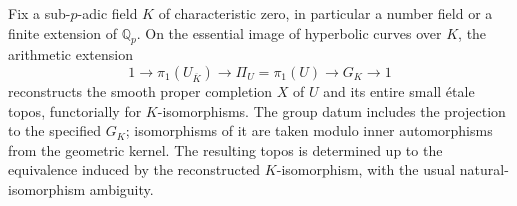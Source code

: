 Fix a sub-$p$-adic field $K$ of characteristic zero, in
particular a number field or a finite extension of
$\mathbb Q_p$.  On the essential image of hyperbolic curves
over $K$, the arithmetic extension
\[
 1\longrightarrow\pi_1(U_{\overline K})
 \longrightarrow\Pi_U=\pi_1(U)
 \longrightarrow G_K\longrightarrow1
 \tag{C.8}
\]
reconstructs the smooth proper completion $X$ of $U$ and its
entire small \'etale topos, functorially for $K$-isomorphisms.
The group datum includes the projection to the specified
$G_K$; isomorphisms of it are taken modulo inner automorphisms
from the geometric kernel.  The resulting topos is determined
up to the equivalence induced by the reconstructed
$K$-isomorphism, with the usual natural-isomorphism ambiguity.

